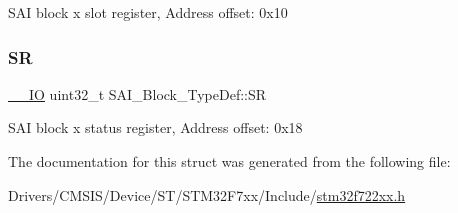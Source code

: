 S\+AI block x slot register, Address offset\+: 0x10 \mbox{\label{struct_s_a_i___block___type_def_ad1505a32bdca9a2f8da708c7372cdafc}} 
\subsubsection{\texorpdfstring{SR}{SR}}
{\footnotesize\ttfamily \mbox{\hyperlink{core__sc300_8h_aec43007d9998a0a0e01faede4133d6be}{\+\_\+\+\_\+\+IO}} uint32\+\_\+t S\+A\+I\+\_\+\+Block\+\_\+\+Type\+Def\+::\+SR}

S\+AI block x status register, Address offset\+: 0x18 

The documentation for this struct was generated from the following file\+:\begin{DoxyCompactItemize}
\item 
Drivers/\+C\+M\+S\+I\+S/\+Device/\+S\+T/\+S\+T\+M32\+F7xx/\+Include/\mbox{\hyperlink{stm32f722xx_8h}{stm32f722xx.\+h}}\end{DoxyCompactItemize}
